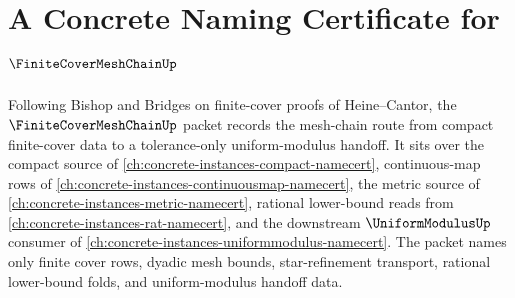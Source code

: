 \chapter{A Concrete Naming Certificate for $\FiniteCoverMeshChainUp$}
\label{ch:concrete-instances-finite-cover-mesh-chain-namecert}

Following Bishop and Bridges on finite-cover proofs of Heine--Cantor, the $\FiniteCoverMeshChainUp$ packet records the mesh-chain route from compact finite-cover data to a tolerance-only uniform-modulus handoff. It sits over the compact source of \autoref{ch:concrete-instances-compact-namecert}, continuous-map rows of \autoref{ch:concrete-instances-continuousmap-namecert}, the metric source of \autoref{ch:concrete-instances-metric-namecert}, rational lower-bound reads from \autoref{ch:concrete-instances-rat-namecert}, and the downstream $\UniformModulusUp$ consumer of \autoref{ch:concrete-instances-uniformmodulus-namecert}. The packet names only finite cover rows, dyadic mesh bounds, star-refinement transport, rational lower-bound folds, and uniform-modulus handoff data.

